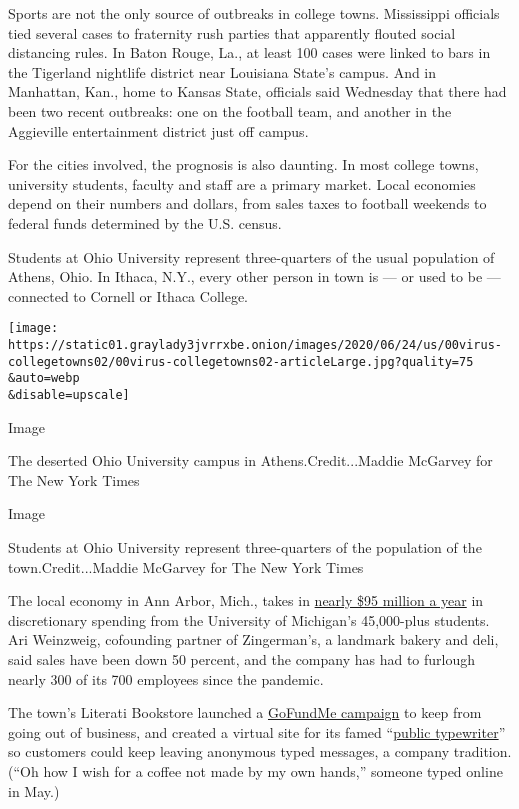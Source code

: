 Sports are not the only source of outbreaks in college towns.
Mississippi officials tied several cases to fraternity rush parties that
apparently flouted social distancing rules. In Baton Rouge, La., at
least 100 cases were linked to bars in the Tigerland nightlife district
near Louisiana State's campus. And in Manhattan, Kan., home to Kansas
State, officials said Wednesday that there had been two recent
outbreaks: one on the football team, and another in the Aggieville
entertainment district just off campus.

For the cities involved, the prognosis is also daunting. In most college
towns, university students, faculty and staff are a primary market.
Local economies depend on their numbers and dollars, from sales taxes to
football weekends to federal funds determined by the U.S. census.

Students at Ohio University represent three-quarters of the usual
population of Athens, Ohio. In Ithaca, N.Y., every other person in town
is --- or used to be --- connected to Cornell or Ithaca College.

\texttt{[image: https://static01.graylady3jvrrxbe.onion/images/2020/06/24/us/00virus-collegetowns02/00virus-collegetowns02-articleLarge.jpg?quality=75\\\&auto=webp\\\&disable=upscale]}

Image

The deserted Ohio University campus in Athens.Credit...Maddie McGarvey
for The New York Times

Image

Students at Ohio University represent three-quarters of the population
of the town.Credit...Maddie McGarvey for The New York Times

The local economy in Ann Arbor, Mich., takes in
\href{https://communityrelations.umich.edu/facts-figures/}{nearly \$95
million a year} in discretionary spending from the University of
Michigan's 45,000-plus students. Ari Weinzweig, cofounding partner of
Zingerman's, a landmark bakery and deli, said sales have been down 50
percent, and the company has had to furlough nearly 300 of its 700
employees since the pandemic.

The town's Literati Bookstore launched a
\href{https://www.gofundme.com/f/support-literati-bookstore-amp-booksellers}{GoFundMe
campaign} to keep from going out of business, and created a virtual site
for its famed ``\href{https://www.publictypewriter.com/}{public
typewriter}'' so customers could keep leaving anonymous typed messages,
a company tradition. (``Oh how I wish for a coffee not made by my own
hands,'' someone typed online in May.)

